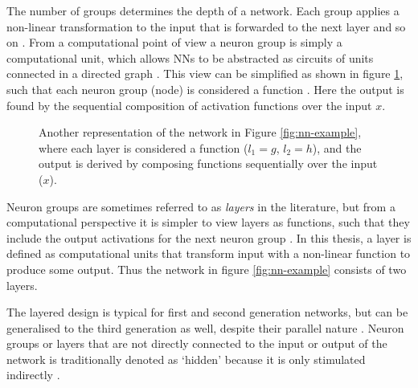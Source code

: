 \documentclass[report.tex]{subfiles}
\begin{document}
The number of groups determines the depth of
a network\cite{Russel2007}.
Each group applies a non-linear transformation to the input that is forwarded
to the next layer and so on \cite{Bishop2006, Russel2007}.
From a computational point of view a neuron group is simply a computational
unit, which allows \glspl{NN} to be abstracted as circuits of units connected in
a directed graph
\cite{Dayan2001, Eliasmith2004, Russel2007}.
This view can be simplified as shown in figure \ref{fig:nn-composition},
such that each neuron group (node)
is considered a function \cite{Rojas1996}.
Here the output is found by the sequential
composition of activation functions over the input $x$.
\begin{figure}
\centering
{}
\caption{Another representation of the network in Figure
  \ref{fig:nn-example}, where each layer is considered a function ($l_1 = g$, $l_2 = h$),
and the output is derived by composing functions sequentially 
over the input ($x$).}
\label{fig:nn-composition}
\end{figure}

Neuron groups are sometimes referred to as \textit{layers} 
in the literature, but from a computational perspective it is simpler to view layers as
functions, such that they include the output activations for the next neuron group \cite{Bishop2006}.
In this thesis, a layer is defined as computational units that transform input
with a non-linear function to produce some output.
Thus the network in figure \ref{fig:nn-example} consists of two layers.

The layered design is typical for first and second generation networks, but 
can be generalised to the third generation as well, despite their parallel
nature \cite{Eliasmith2015}. %
Neuron groups or layers that are not directly connected to the input or output
of the network is traditionally denoted as `hidden' because it is only
stimulated indirectly \cite{Russel2007}.
\end{document}
